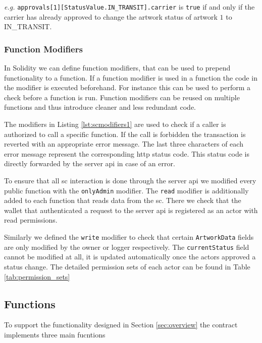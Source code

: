 

\textit{e.g.} \texttt{approvals[1][StatusValue.IN\_TRANSIT].carrier} is \texttt{true} if and only if the carrier has already approved to change the artwork status of artwork $1$ to IN\_TRANSIT.


\subsubsection{Function Modifiers}
In Solidity we can define function modifiers, that can be used to prepend functionality to a function. If a function modifier is used in a function the code in the modifier is executed beforehand. For instance this can be used to perform a check before a function is run. Function modifiers can be reused on multiple functions and thus introduce cleaner and less redundant code.



The modifiers in Listing \ref{lst:scmodifiers1} are used to check if a caller is authorized to call a specific function. If the call is forbidden the transaction is reverted with an appropriate error message. The last three characters of each error message represent the corresponding \gls{http} status code. This status code is directly forwarded by the server \gls{api} in case of an error.

To ensure that all \gls{sc} interaction is done through the server \gls{api} we modified every public function with the \texttt{onlyAdmin} modifier. The \texttt{read} modifier is additionally added to each function that reads data from the \gls{sc}. There we check that the wallet that authenticated a request to the server \gls{api} is registered as an actor with read permissions.

Similarly we defined the \texttt{write} modifier to check that certain \texttt{ArtworkData} fields are only modified by the owner or logger respectively. The \texttt{currentStatus} field cannot be modified at all, it is updated automatically once the actors approved a status change. The detailed permission sets of each actor can be found in Table \ref{tab:permission_sets} 

\subsection{Functions}
To support the functionality designed in Section \ref{sec:overview} the contract implements three main fucntions

